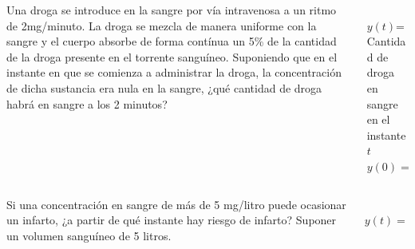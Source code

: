 \documentclass[aspectratio=149,10pt,xcolor=dvipsnames,t]{beamer}
\begin{document}
\begin{frame}
\begin{columns}
\begin{column}[T]{0.7\textwidth}
Una droga se introduce en la sangre por vía intravenosa a un ritmo de 2mg/minuto. La droga se mezcla de
manera uniforme con la sangre y el cuerpo absorbe de forma contínua un 5\% de la cantidad de la droga presente en el torrente
sanguíneo. Suponiendo que en el instante en  que se comienza a administrar la droga, la concentración de dicha sustancia
era nula en la sangre, ¿qué cantidad de droga habrá en sangre a los 2 minutos? 
\end{column}
\begin{column}[T]{0.3\textwidth}
\\
$y(t)$= Cantidad de droga en sangre en el instante $t$\\
$y(0)=0$
\end{column}
\end{columns}
\end{frame}


\begin{frame}
\begin{columns}
\begin{column}[T]{0.7\textwidth}
Si una concentración en sangre de más de 5 mg/litro puede ocasionar un infarto, ¿a partir de qué instante hay riesgo de
infarto? Suponer un volumen sanguíneo de 5 litros.
\end{column}
\begin{column}[T]{0.3\textwidth}
\\
$y(t)=40-40e^{-0.05t}$\\
\end{column}
\end{columns}
\end{frame}
\end{document}

